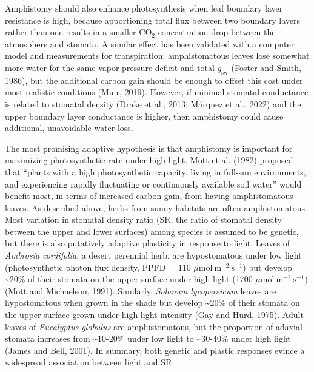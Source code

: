 \documentclass[
  letterpaper,
  DIV=11,
  numbers=noendperiod]{scrartcl}
\begin{document}
Amphistomy should also enhance photosynthesis when leaf boundary layer
resistance is high, because apportioning total flux between two boundary
layers rather than one results in a smaller CO\(_2\) concentration drop
between the atmosphere and stomata. A similar effect has been validated
with a computer model and measurements for transpiration: amphistomatous
leaves lose somewhat more water for the same vapor pressure deficit and
total \(g_\mathrm{sw}\) (Foster and Smith, 1986), but the additional
carbon gain should be enough to offset this cost under most realistic
conditions (Muir, 2019). However, if minimal stomatal conductance is
related to stomatal density (Drake et al., 2013; Márquez et al., 2022)
and the upper boundary layer conductance is higher, then amphistomy
could cause additional, unavoidable water loss.

The most promising adaptive hypothesis is that amphistomy is important
for maximizing photosynthetic rate under high light. Mott et al. (1982)
proposed that ``plants with a high photosynthetic capacity, living in
full-sun environments, and experiencing rapidly fluctuating or
continuously available soil water'' would benefit most, in terms of
increased carbon gain, from having amphistomatous leaves. As described
above, herbs from sunny habitats are often amphistomatous. Most
variation in stomatal density ratio (\(\mathrm{SR}\), the ratio of
stomatal density between the upper and lower surfaces) among species is
assumed to be genetic, but there is also putatively adaptive plasticity
in response to light. Leaves of \emph{Ambrosia cordifolia}, a desert
perennial herb, are hypostomatous under low light (photosynthetic photon
flux density, PPFD = 110 \(\mu \text{mol}~\text{m}^{-2}~\text{s}^{-1}\))
but develop \textasciitilde20\% of their stomata on the upper surface
under high light (1700 \(\mu \text{mol}~\text{m}^{-2}~\text{s}^{-1}\))
(Mott and Michaelson, 1991). Similarly, \emph{Solanum lycopersicum}
leaves are hypostomatous when grown in the shade but develop
\textasciitilde20\% of their stomata on the upper surface grown under
high light-intensity (Gay and Hurd, 1975). Adult leaves of
\emph{Eucalyptus globulus} are amphistomatous, but the proportion of
adaxial stomata increases from \textasciitilde10-20\% under low light to
\textasciitilde30-40\% under high light (James and Bell, 2001). In
summary, both genetic and plastic responses evince a widespread
association between light and \(\mathrm{SR}\).
\end{document}
